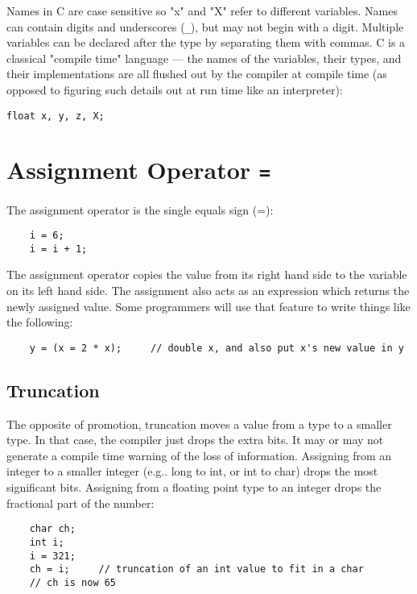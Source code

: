 Names in C are case sensitive so "x" and "X" refer to different variables. Names can contain digits and underscores (\lstinline{_}), but may not begin with a digit. Multiple variables can be declared after the type by separating them with commas. C is a classical "compile time" language --- the names of the variables, their types, and their implementations are all flushed out by the compiler at compile time (as opposed to figuring such details out at run time like an interpreter):

\begin{lstlisting}
float x, y, z, X;
\end{lstlisting}

\section{Assignment Operator \lstinline{=}}

The assignment operator is the single equals sign (=):

\begin{lstlisting}
    i = 6;
    i = i + 1;
\end{lstlisting}

The assignment operator copies the value from its right hand side to the variable on its left hand side. The assignment also acts as an expression which returns the newly assigned value. Some programmers will use that feature to write things like the following:

\begin{lstlisting}
    y = (x = 2 * x);     // double x, and also put x's new value in y
\end{lstlisting}

\subsection{Truncation}

The opposite of promotion, truncation moves a value from a type to a smaller type. In that case, the compiler just drops the extra bits. It may or may not generate a compile time warning of the loss of information. Assigning from an integer to a smaller integer (e.g.. long to int, or int to char) drops the most significant bits. Assigning from a floating point type to an integer drops the fractional part of the number:

\begin{lstlisting}
    char ch;
    int i;
    i = 321;
    ch = i;     // truncation of an int value to fit in a char
    // ch is now 65
\end{lstlisting}


